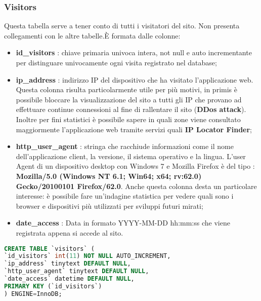 \subsubsection{Visitors}
Questa tabella serve a tener conto di tutti i visitatori del sito. Non presenta collegamenti con le altre tabelle.\newline È formata dalle colonne:

\begin{itemize}
\item \textbf{id\_visitors} : chiave primaria univoca intera, not null e auto incrementante per distinguare univocamente ogni visita registrato nel database;
\item \textbf{ip\_address} : indirizzo IP del dispositivo che ha visitato l'applicazione web. \newline Questa colonna risulta particolarmente utile per più motivi, in primis è possibile bloccare la visualizzazione del sito a tutti gli IP che provano ad effettuare continue connessioni al fine di rallentare il sito (\textbf{DDos attack}). Inoltre per fini statistici è possibile sapere in quali zone viene consultato maggiormente l'applicazione web tramite servizi quali \textbf{IP Locator Finder};
\item \textbf{http\_user\_agent} : stringa che racchiude informazioni come il nome dell'applicazione client, la versione, il sistema operativo e la lingua. \newline L'user Agent di un dispositivo desktop con Windows 7 e Mozilla Firefox è del tipo : \textbf{Mozilla/5.0 (Windows NT 6.1; Win64; x64; rv:62.0) Gecko/20100101 Firefox/62.0}.
Anche questa colonna desta un particolare interesse: è possibile fare un'indagine statistica per vedere quali sono i browser e dispositivi più utilizzati per sviluppi futuri mirati;
\item \textbf{date\_access} : Data in formato YYYY-MM-DD hh:mm:ss che viene registrata appena si accede al sito.
\end{itemize}

\begin{lstlisting}[language=SQL, caption=Codice SQL della Tabella Visitors]
CREATE TABLE `visitors` (
`id_visitors` int(11) NOT NULL AUTO_INCREMENT,
`ip_address` tinytext DEFAULT NULL,
`http_user_agent` tinytext DEFAULT NULL,
`date_access` datetime DEFAULT NULL,
PRIMARY KEY (`id_visitors`)
) ENGINE=InnoDB;

\end{lstlisting}

